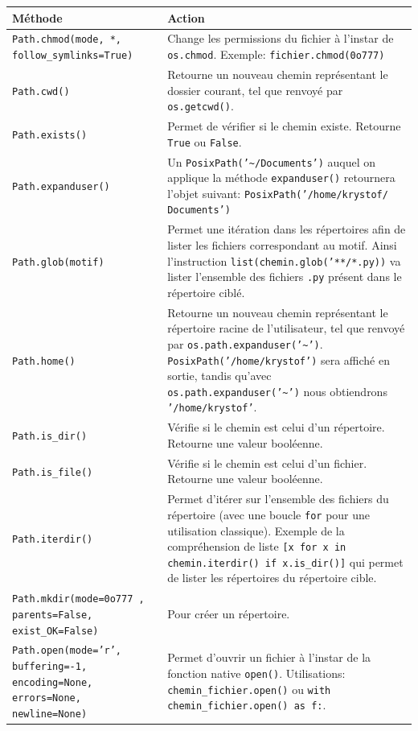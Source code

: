 \documentclass[a4paper,12pt]{book}
\begin{document}
\begin{table}[h]\label{pathlib_1}
\begin{center}
\begin{tabular}{|p{4cm}|p{10.5cm}|}
\hline
\textbf{Méthode} & \textbf{Action} \\
\hline
\texttt{Path.chmod(mode, *, follow\_symlinks=True)} & Change les permissions du fichier à l'instar de \texttt{os.chmod}. Exemple: \texttt{fichier.chmod(0o777)} \\
\hline
\texttt{Path.cwd()} & Retourne un nouveau chemin représentant le dossier courant, tel que renvoyé par \texttt{os.getcwd()}. \\
\hline
\texttt{Path.exists()} & Permet de vérifier si le chemin existe. Retourne \texttt{True} ou \texttt{False}. \\
\hline
\texttt{Path.expanduser()} & Un \texttt{PosixPath('\~{}/Documents')} auquel on applique la méthode \texttt{expanduser()} retournera l'objet suivant: \texttt{PosixPath('/home/krystof/ Documents')} \\
\hline
\texttt{Path.glob(motif)} & Permet une itération dans les répertoires afin de lister les fichiers correspondant au motif. Ainsi l'instruction \texttt{list(chemin.glob('**/*.py))} va lister l'ensemble des fichiers \texttt{.py} présent dans le répertoire ciblé. \\
\hline
\texttt{Path.home()} & Retourne un nouveau chemin représentant le répertoire racine de l'utilisateur, tel que renvoyé par \texttt{os.path.expanduser('\~{}')}. \texttt{PosixPath('/home/krystof')} sera affiché en sortie, tandis qu'avec \texttt{os.path.expanduser('\~{}')} nous obtiendrons \texttt{'/home/krystof'}. \\
\hline
\texttt{Path.is\_dir()} & Vérifie si le chemin est celui d'un répertoire. Retourne une valeur booléenne. \\
\hline
\texttt{Path.is\_file()} & Vérifie si le chemin est celui d'un fichier. Retourne une valeur booléenne. \\
\hline
\texttt{Path.iterdir()} & Permet d'itérer sur l'ensemble des fichiers du répertoire (avec une boucle \texttt{for} pour une utilisation classique). Exemple de la compréhension de liste \texttt{[x for x in chemin.iterdir() if x.is\_dir()]} qui permet de lister les répertoires du répertoire cible. \\
\hline
\texttt{Path.mkdir(mode=0o777 , parents=False, exist\_OK=False)} & Pour créer un répertoire. \\
\hline
\texttt{Path.open(mode='r', buffering=-1, encoding=None, errors=None, newline=None)} & Permet d'ouvrir un fichier à l'instar de la fonction native \texttt{open()}. Utilisations: \texttt{chemin\_fichier.open()} ou \texttt{with chemin\_fichier.open() as f:}. \\

\end{tabular}
\end{center}
\end{table}
\end{document}
